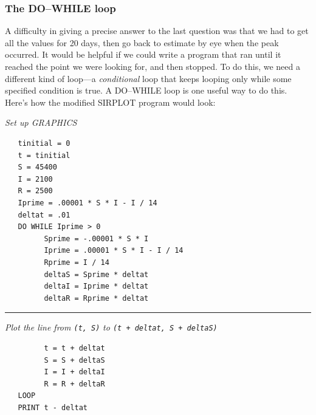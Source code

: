 \subsubsection{The DO--WHILE loop}
\label{DO-WHILE}

A difficulty in giving a precise answer to the last question was that
 we had to get all the values for 20 days, then go back to estimate by
 eye when the peak occurred.  It would be helpful if we could write a
 program that ran until it reached the point we were looking for, and
 then stopped.  To do this, we need a different kind of loop---a {\em
 conditional\/} loop that keeps looping only while some specified
 condition is true.  A DO--WHILE loop is one useful way to do
 this. Here's how the modified SIRPLOT program would look:


\enlargethispage*{20pt}
{\small
{\sl Set up GRAPHICS}

\begin{verbatim}
   tinitial = 0
   t = tinitial
   S = 45400
   I = 2100
   R = 2500
   Iprime = .00001 * S * I - I / 14
   deltat = .01
   DO WHILE Iprime > 0
         Sprime = -.00001 * S * I
         Iprime = .00001 * S * I - I / 14
         Rprime = I / 14
         deltaS = Sprime * deltat
         deltaI = Iprime * deltat
         deltaR = Rprime * deltat
\end{verbatim}

\rule{47pt}{0pt} {\sl Plot the line from 
		{\tt (t, S)}} {\sl to 
		{\tt (t + deltat, S + deltaS)}}\\

\begin{verbatim}
         t = t + deltat
         S = S + deltaS
         I = I + deltaI
         R = R + deltaR
   LOOP
   PRINT t - deltat
\end{verbatim}
}%


